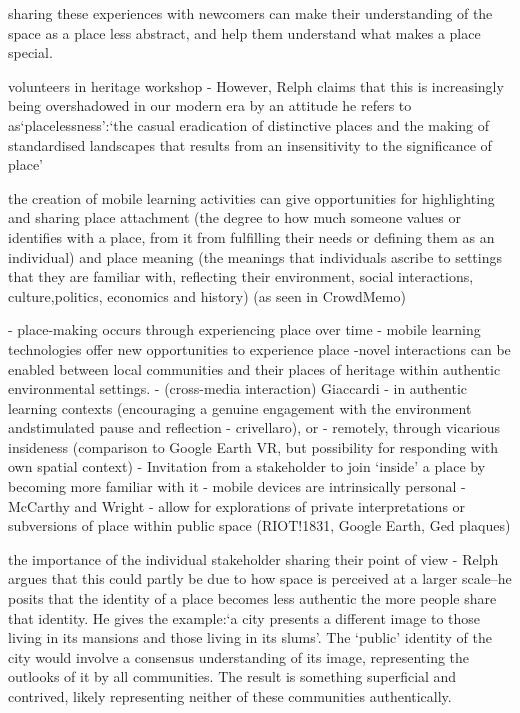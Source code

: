 sharing these experiences with newcomers can make their understanding of the space as a place less abstract, and help them understand what makes a place special. 

volunteers in heritage workshop - However, Relph claims that this is increasingly being overshadowed in our modern era by an attitude he refers to as‘placelessness’:‘the casual eradication of distinctive places and the making of standardised landscapes that results from an insensitivity to the significance of place’

the creation of mobile learning activities can give opportunities for highlighting and sharing place attachment (the degree to how much someone values or identifies with a place, from it from fulfilling their needs or defining them as an individual) and place meaning (the meanings that individuals ascribe to settings that they are familiar with, reflecting their environment, social interactions, culture,politics, economics and history) (as seen in CrowdMemo)

- place-making occurs through experiencing place over time - mobile learning technologies offer new opportunities to experience place
    -novel interactions can be enabled between local communities and their places of heritage within authentic environmental settings. - (cross-media interaction) Giaccardi
    - in authentic learning contexts (encouraging a genuine engagement with the environment andstimulated pause and reflection - crivellaro), or
    - remotely, through vicarious insideness (comparison to Google Earth VR, but possibility for responding with own spatial context)
    - Invitation from a stakeholder to join `inside' a place by becoming more familiar with it
    - mobile devices are intrinsically personal - McCarthy and Wright 
    - allow for explorations of private interpretations or subversions of place within public space (RIOT!1831, Google Earth, Ged plaques)


the importance of the individual stakeholder sharing their point of view - Relph argues that this could partly be due to how space is perceived at a larger scale–he posits that the identity of a place becomes less authentic the more people share that identity.  He gives the example:‘a city presents a different image to those living in its mansions and those living in its slums’. The ‘public’ identity of the city would involve a consensus understanding of its image, representing the outlooks of it by all communities. The result is something superficial and contrived, likely representing neither of these communities authentically.

